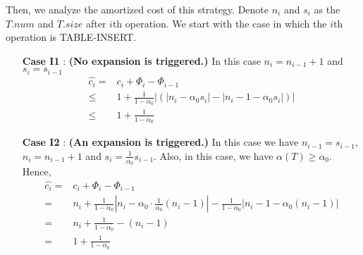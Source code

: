 \documentclass[12pt,onecolumn,a4paper]{article}
\begin{document}
Then, we analyze the amortized cost of this strategy. Denote $n_i$ and $s_i$ as the $T.num$ and $T.size$ after $i$th operation.
We start with the case in which the $i$th operation is TABLE-INSERT. 
\begin{itemize}
	\item [\textbf{Case I1}]: \textbf{(No expansion is triggered.)} In this case $n_i=n_{i-1}+1$ and $s_i=s_{i-1}$
	\begin{equation*}
		\begin{split}
			\hat{c_i}=&c_i+\Phi_i-\Phi_{i-1}\\
			\le&1+\frac{1}{1-\alpha_0}|(|n_i-\alpha_0s_i|-|n_i-1-\alpha_0s_i|)|\\
			\le&1+\frac{1}{1-\alpha_0}
		\end{split}
	\end{equation*}
	\item [\textbf{Case I2}]: \textbf{(An expansion is triggered.)} In this case we have $n_{i-1}=s_{i-1}$, $n_i=n_{i-1}+1$ and $s_i=\frac{1}{\alpha_0}s_{i-1}$. Also, in this case, we have $\alpha(T)\ge \alpha_0$. Hence,
	\begin{equation*}
		\begin{split}
			\hat{c_i}=&c_i+\Phi_i-\Phi_{i-1}\\
			=&n_i+\frac{1}{1-\alpha_0}|n_i-\alpha_0\cdot \frac{1}{\alpha_0}(n_i-1)|-\frac{1}{1-\alpha_0}|n_i-1-\alpha_0(n_i-1)|\\
			=&n_i+\frac{1}{1-\alpha_0}-(n_i-1)\\
			=&1+\frac{1}{1-\alpha_0}
		\end{split}
	\end{equation*}
\end{itemize}
\end{document}
